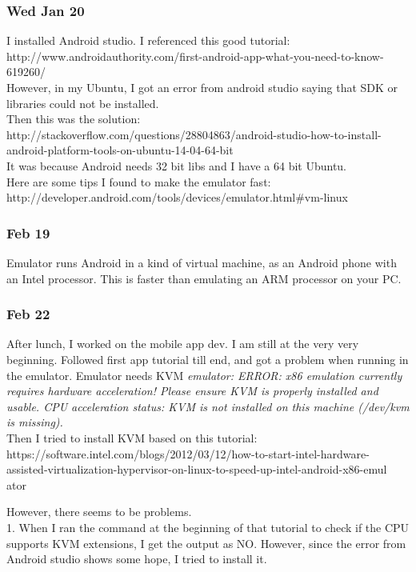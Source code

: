 \documentclass[11pt]{article}
\begin{document}
\subsubsection*{Wed Jan 20}
I installed Android studio. I referenced this good tutorial: http://www.androidauthority.com/first-android-app-what-you-need-to-know-619260/\\
However, in my Ubuntu, I got an error from android studio saying that SDK or libraries could not be installed. \\
Then this was the solution: http://stackoverflow.com/questions/28804863/android-studio-how-to-install-android-platform-tools-on-ubuntu-14-04-64-bit\\
It was because Android needs 32 bit libs and I have a 64 bit Ubuntu.\\
Here are some tips I found to make the emulator fast:
http://developer.android.com/tools/devices/emulator.html\#vm-linux

\subsubsection*{Feb 19}
Emulator runs Android in a kind of virtual machine, as an Android phone with an Intel processor. This is faster than emulating an ARM processor on 
your PC.

\subsubsection*{Feb 22}
After lunch, I worked on the mobile app dev. I am still at the very very beginning. Followed first app tutorial till end, and got a problem when 
running in the emulator. Emulator needs KVM \textit{emulator: ERROR: x86 emulation currently requires hardware acceleration!
Please ensure KVM is properly installed and usable.
CPU acceleration status: KVM is not installed on this machine (/dev/kvm is missing).} \\

Then I tried to install KVM based on this tutorial:\\
https://software.intel.com/blogs/2012/03/12/how-to-start-intel-hardware-assisted-virtualization-hypervisor-on-linux-to-speed-up-intel-android-x86-emul
ator

However, there seems to be problems. \\
1. When I ran the command at the beginning of that tutorial to check if the CPU supports KVM extensions, I get 
the output as NO. However, since the error from Android studio shows some hope, I tried to install it.
\end{document}
